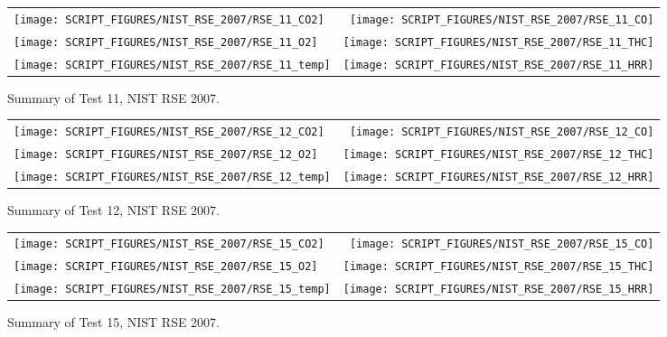 \begin{figure}[p]
\begin{tabular*}{\textwidth}{l@{\extracolsep{\fill}}r}
\texttt{[image: SCRIPT\_FIGURES/NIST\_RSE\_2007/RSE\_11\_CO2]} &
\texttt{[image: SCRIPT\_FIGURES/NIST\_RSE\_2007/RSE\_11\_CO]} \\
\texttt{[image: SCRIPT\_FIGURES/NIST\_RSE\_2007/RSE\_11\_O2]} &
\texttt{[image: SCRIPT\_FIGURES/NIST\_RSE\_2007/RSE\_11\_THC]} \\
\texttt{[image: SCRIPT\_FIGURES/NIST\_RSE\_2007/RSE\_11\_temp]} &
\texttt{[image: SCRIPT\_FIGURES/NIST\_RSE\_2007/RSE\_11\_HRR]}
\end{tabular*}
\caption[Summary of Test 11, NIST RSE 2007]{Summary of Test 11, NIST RSE 2007.}
\label{NIST_RSE_2007_11}
\end{figure}

\begin{figure}[p]
\begin{tabular*}{\textwidth}{l@{\extracolsep{\fill}}r}
\texttt{[image: SCRIPT\_FIGURES/NIST\_RSE\_2007/RSE\_12\_CO2]} &
\texttt{[image: SCRIPT\_FIGURES/NIST\_RSE\_2007/RSE\_12\_CO]} \\
\texttt{[image: SCRIPT\_FIGURES/NIST\_RSE\_2007/RSE\_12\_O2]} &
\texttt{[image: SCRIPT\_FIGURES/NIST\_RSE\_2007/RSE\_12\_THC]} \\
\texttt{[image: SCRIPT\_FIGURES/NIST\_RSE\_2007/RSE\_12\_temp]} &
\texttt{[image: SCRIPT\_FIGURES/NIST\_RSE\_2007/RSE\_12\_HRR]}
\end{tabular*}
\caption[Summary of Test 12, NIST RSE 2007]{Summary of Test 12, NIST RSE 2007.}
\label{NIST_RSE_2007_12}
\end{figure}

\begin{figure}[p]
\begin{tabular*}{\textwidth}{l@{\extracolsep{\fill}}r}
\texttt{[image: SCRIPT\_FIGURES/NIST\_RSE\_2007/RSE\_15\_CO2]} &
\texttt{[image: SCRIPT\_FIGURES/NIST\_RSE\_2007/RSE\_15\_CO]} \\
\texttt{[image: SCRIPT\_FIGURES/NIST\_RSE\_2007/RSE\_15\_O2]} &
\texttt{[image: SCRIPT\_FIGURES/NIST\_RSE\_2007/RSE\_15\_THC]} \\
\texttt{[image: SCRIPT\_FIGURES/NIST\_RSE\_2007/RSE\_15\_temp]} &
\texttt{[image: SCRIPT\_FIGURES/NIST\_RSE\_2007/RSE\_15\_HRR]}
\end{tabular*}
\caption[Summary of Test 15, NIST RSE 2007]{Summary of Test 15, NIST RSE 2007.}
\label{NIST_RSE_2007_15}
\end{figure}

